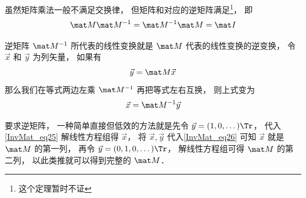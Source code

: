虽然矩阵乘法一般不满足交换律， 但矩阵和对应的逆矩阵满足\footnote{这个定理暂时不证}， 即
\begin{equation}
\mat M\mat M^{-1} = \mat M^{-1} \mat M = \mat I
\end{equation}

逆矩阵 $\mat M^{-1}$ 所代表的线性变换就是 $\mat M$ 代表的线性变换的逆变换， 令 $\vec x$ 和 $\vec y$ 为列矢量， 如果有
\begin{equation}\label{Mat_eq25}
\vec y = \mat M \vec x
\end{equation}
那么我们在等式两边左乘 $\mat M^{-1}$ 再把等式左右互换， 则上式变为
\begin{equation}\label{Mat_eq26}
\vec x = \mat M^{-1} \vec y
\end{equation}

要求逆矩阵， 一种简单直接但低效的方法就是先令 $\vec y = (1, 0, \dots)\Tr$， 代入\autoref{InvMat_eq25} 解线性方程组得 $\vec x$， 将 $\vec x, \vec y$ 代入\autoref{InvMat_eq26} 可知 $\vec x$ 就是 $\mat M$ 的第一列， 再令 $\vec y = (0, 1, 0, \dots)\Tr$， 解线性方程组可得 $\mat M$ 的第二列， 以此类推就可以得到完整的 $\mat M$．
